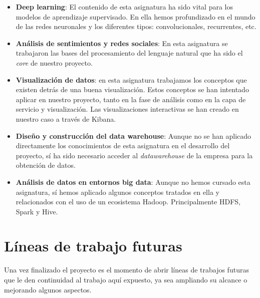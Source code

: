 \begin{itemize}
\item  \textbf{Deep learning}: El contenido de esta asignatura ha sido vital para los modelos de aprendizaje supervisado. En ella hemos profundizado en el mundo de las redes neuronales y los diferentes tipos: convolucionales, recurrentes, etc.

\item  \textbf{Análisis de sentimientos y redes sociales}: En esta asignatura se trabajaron las bases del procesamiento del lenguaje natural que ha sido el \textit{core} de nuestro proyecto.

\item  \textbf{Visualización de datos}: en esta asignatura trabajamos los conceptos que existen detrás de una buena visualización. Estos conceptos se han intentado aplicar en nuestro proyecto, tanto en la fase de análisis como en la capa de servicio y visualización. Las visualizaciones interactivas se han creado en nuestro caso a través de Kibana.

\item  \textbf{Diseño y construcción del data warehouse}: Aunque no se han aplicado directamente los conocimientos de esta asignatura en el desarrollo del proyecto, sí ha sido necesario acceder al \textit{datawarehouse} de la empresa para la obtención de datos.


\item \textbf{Análisis de datos en entornos big data}: Aunque no hemos cursado esta asignatura, sí hemos aplicado algunos conceptos tratados en ella y relacionados con el uso de un ecosistema Hadoop. Principalmente HDFS, Spark y Hive.


\end{itemize}





\section{Líneas de trabajo futuras}


Una vez finalizado el proyecto es el momento de abrir líneas de trabajos futuras que le den continuidad al trabajo aquí expuesto, ya sea ampliando su alcance o mejorando algunos aspectos.




